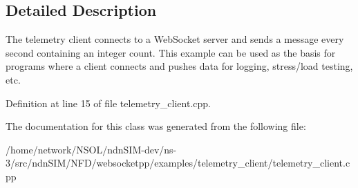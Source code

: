 \subsection{Detailed Description}
The telemetry client connects to a Web\+Socket server and sends a message every second containing an integer count. This example can be used as the basis for programs where a client connects and pushes data for logging, stress/load testing, etc. 

Definition at line 15 of file telemetry\+\_\+client.\+cpp.



The documentation for this class was generated from the following file\+:\begin{DoxyCompactItemize}
\item 
/home/network/\+N\+S\+O\+L/ndn\+S\+I\+M-\/dev/ns-\/3/src/ndn\+S\+I\+M/\+N\+F\+D/websocketpp/examples/telemetry\+\_\+client/telemetry\+\_\+client.\+cpp\end{DoxyCompactItemize}
